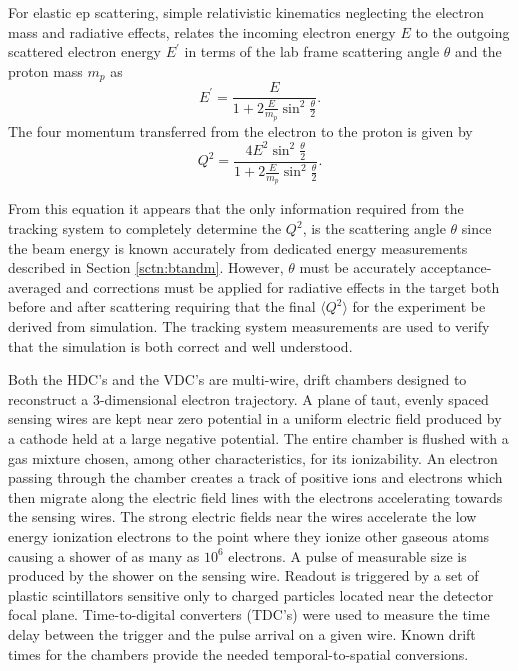 For elastic ep scattering, simple relativistic kinematics neglecting the electron mass and radiative effects, relates the incoming electron energy $E$ to the outgoing scattered electron energy $E^{\prime}$ in terms of the lab frame scattering angle $\theta$ and the proton mass $m_p$ as
\begin{equation}
E^{\prime} = \frac{E}{1+2\frac{E}{m_p}\sin^2\frac{\theta}{2}}.
\label{eq:Eprime}
\end{equation}
The four momentum transferred from the electron to the proton is given by
\begin{equation}
  Q^2=\frac{4E^2\sin^2\frac{\theta}{2}}{1+2\frac{E}{m_p}\sin^2\frac{\theta}{2}}.
\label{eq:Qsquared}
\end{equation}

From this equation it appears that the only information required from the tracking system to completely determine the $Q^2$, is the scattering angle $\theta$ since the beam energy is known accurately from dedicated energy measurements described in Section \ref{sctn:btandm}. However, $\theta$ must be accurately acceptance-averaged and corrections must be applied for radiative effects in the target both before and after scattering requiring that the final $\langle Q^2 \rangle$ for the experiment be derived from simulation. The tracking system measurements are used to verify that the simulation is both correct and well understood. 

Both the HDC's and the VDC's are multi-wire, drift chambers designed to reconstruct a 3-dimensional electron trajectory. A plane of taut, evenly spaced sensing wires are kept near zero potential in a uniform electric field produced by a cathode held at a large negative potential. The entire chamber is flushed with a gas mixture chosen, among other characteristics, for its ionizability. An electron passing through the chamber creates a track of positive ions and electrons which then migrate along the electric field lines with the electrons accelerating towards the sensing wires. The strong electric fields near the wires accelerate the low energy ionization electrons to the point where they ionize other gaseous atoms causing a shower of as many as $10^6$ electrons. A pulse of measurable size is produced by the shower on the sensing wire. Readout is triggered by a set of plastic scintillators sensitive only to charged particles located near the detector focal plane. Time-to-digital converters (TDC's) were used to measure the time delay between the trigger and the pulse arrival on a given wire. Known drift times for the chambers provide the needed temporal-to-spatial conversions.   

